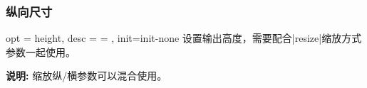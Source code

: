 \documentclass[full]{l3doc}
\def\vers{\texttt{v1.2.0} }
\begin{document}
\begin{documentation}
\bigskip

\subsubsection{纵向尺寸}

\begin{option}{ opt = height, desc = {= }, init=init-none }
  设置输出高度，需要配合|resize|缩放方式参数一起使用。
\end{option}

\begin{SideBySideExample}[frame=single,numbers=left,
                xrightmargin=.65\linewidth,gobble=2]
  \centering
  \cchessboard[%
    resize/type=real,
    resize/height=6cm]
\end{SideBySideExample}

  \textbf{\textsf{说明: }}缩放纵/横参数可以混合使用。

\bigskip


%
%
%

\end{documentation}
\end{document}
